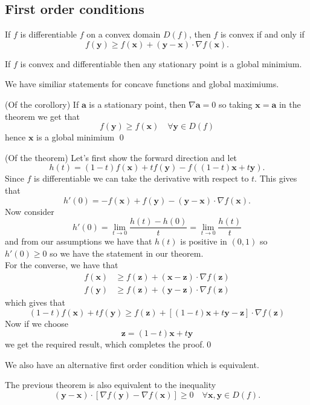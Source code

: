 \documentclass{article}
\begin{document}
\subsection{First order conditions}
\begin{theorem}
  If $ f $ is differentiable $ f $ on a convex domain $ D(f) $, then $ f $ is convex if and only if
  \[
    f(\mathbf y) \ge  f(\mathbf x) + (\mathbf y -\mathbf x) \cdot\nabla f(\mathbf x).
  \]
\end{theorem}
\begin{corollory}
  If $ f $ is convex and differentiable then any stationary point is a global minimium.
\end{corollory}
\begin{remark}
   We have similiar statements for concave functions and global maximiums.
\end{remark}
\pf (Of the corollory) If $ \mathbf a $ is a stationary point, then $ \nabla \mathbf a = 0 $ so taking $ \mathbf x = \mathbf a $ in the theorem we get that \[
  f(\mathbf y)\ge f(\mathbf x)\quad\forall\mathbf y\in D(f)
\]
hence $ \mathbf x $ is a global minimium \qed\par
\pf (Of the theorem) Let's first show the forward direction and let 
\[
  h(t)=(1-t)f(\mathbf x)+tf(\mathbf y)-f((1-t)\mathbf x + t\mathbf y).
\]
Since $ f $ is differentiable we can take the derivative with respect to $ t $. This gives that
\[
  h'(0)=-f(\mathbf x)+f(\mathbf y)-(\mathbf y - \mathbf x)\cdot\nabla f(\mathbf x).
\]
Now consider
\[
	h'(0)=\lim_{t\to 0}\frac{h(t)-h(0)}t=\lim_{t\to 0}\frac{h(t)}t
\]
and from our assumptions we have that $ h(t) $ is positive in $ (0,1) $ so $ h'(0)\ge 0 $ so we have the statement in our theorem.\\
For the converse, we have that
\begin{align*}
	f(\mathbf x)&\ge f(\mathbf z)+(\mathbf x - \mathbf z)\cdot\nabla f(\mathbf z)\\
	f(\mathbf y) &\ge f(\mathbf z) + (\mathbf y - \mathbf z)\cdot \nabla f(\mathbf z)
\end{align*}
which gives that
\[
	(1-t)f(\mathbf x)+tf(\mathbf y)\ge f(\mathbf z)+[(1-t)\mathbf x +t\mathbf y - \mathbf z]\cdot\nabla f(\mathbf z)
\]
Now if we choose
\[
  \mathbf z=(1-t)\mathbf x +t \mathbf y
\]
we get the required result, which completes the proof.\qed\par
We also have an alternative first order condition which is equivalent.
\begin{claim}
  The previous theorem is also equivalent to the inequality
  \[
	  (\mathbf y-\mathbf x)\cdot\left[\nabla f(\mathbf y)-\nabla f(\mathbf x)\right]\ge 0\quad \forall \mathbf x,\mathbf y\in D(f). 
  \]
\end{claim}
\end{document}
